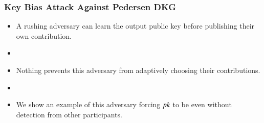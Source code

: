 \documentclass[hyperref={pdfpagelabels=true},table,dvipsnames,14pt,aspectratio=169]{beamer}
\begin{document}
\begin{frame}
  \frametitle{Key Bias Attack Against Pedersen DKG}

  \begin{itemize}
    \item<1-> A rushing adversary can learn the output public key before publishing their own contribution.
    \item[]
    \item<2-> Nothing prevents this adversary from adaptively choosing their contributions.
    \item[]
    \item<3-> We show an example of this adversary forcing $\mathit{pk}$ to be even without detection from other participants.
  \end{itemize}
\end{frame}

\begin{frame}
  \centering
{}
\end{frame}
\end{document}
